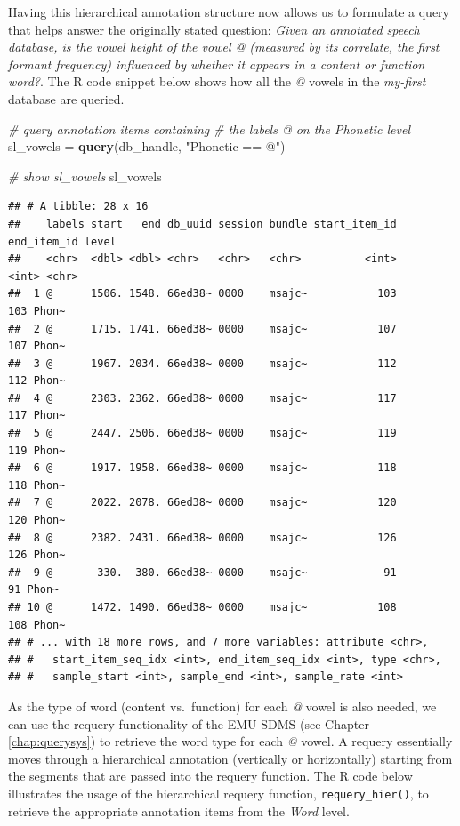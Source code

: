 \documentclass[]{book}
\newenvironment{Shaded}{\begin{snugshade}}{\end{snugshade}}
\newcommand{\CommentTok}[1]{\textcolor[rgb]{0.56,0.35,0.01}{\textit{#1}}}
\newcommand{\KeywordTok}[1]{\textcolor[rgb]{0.13,0.29,0.53}{\textbf{#1}}}
\newcommand{\NormalTok}[1]{#1}
\newcommand{\StringTok}[1]{\textcolor[rgb]{0.31,0.60,0.02}{#1}}
\begin{document}
Having this hierarchical annotation structure now allows us to formulate a query that helps answer the originally stated question: \emph{Given an annotated speech database, is the vowel height of the vowel @ (measured by its correlate, the first formant frequency) influenced by whether it appears in a content or function word?}. The R code snippet below shows how all the \emph{@} vowels in the \emph{my-first} database are queried.

\begin{Shaded}
\begin{Highlighting}[]
\CommentTok{# query annotation items containing}
\CommentTok{# the labels @ on the Phonetic level}
\NormalTok{sl_vowels =}\StringTok{ }\KeywordTok{query}\NormalTok{(db_handle, }\StringTok{"Phonetic == @"}\NormalTok{)}

\CommentTok{# show sl_vowels}
\NormalTok{sl_vowels}
\end{Highlighting}
\end{Shaded}

\begin{verbatim}
## # A tibble: 28 x 16
##    labels start   end db_uuid session bundle start_item_id end_item_id level
##    <chr>  <dbl> <dbl> <chr>   <chr>   <chr>          <int>       <int> <chr>
##  1 @      1506. 1548. 66ed38~ 0000    msajc~           103         103 Phon~
##  2 @      1715. 1741. 66ed38~ 0000    msajc~           107         107 Phon~
##  3 @      1967. 2034. 66ed38~ 0000    msajc~           112         112 Phon~
##  4 @      2303. 2362. 66ed38~ 0000    msajc~           117         117 Phon~
##  5 @      2447. 2506. 66ed38~ 0000    msajc~           119         119 Phon~
##  6 @      1917. 1958. 66ed38~ 0000    msajc~           118         118 Phon~
##  7 @      2022. 2078. 66ed38~ 0000    msajc~           120         120 Phon~
##  8 @      2382. 2431. 66ed38~ 0000    msajc~           126         126 Phon~
##  9 @       330.  380. 66ed38~ 0000    msajc~            91          91 Phon~
## 10 @      1472. 1490. 66ed38~ 0000    msajc~           108         108 Phon~
## # ... with 18 more rows, and 7 more variables: attribute <chr>,
## #   start_item_seq_idx <int>, end_item_seq_idx <int>, type <chr>,
## #   sample_start <int>, sample_end <int>, sample_rate <int>
\end{verbatim}

As the type of word (content vs.~function) for each \emph{@} vowel is also needed, we can use the requery functionality of the EMU-SDMS (see Chapter \ref{chap:querysys}) to retrieve the word type for each \emph{@} vowel. A requery essentially moves through a hierarchical annotation (vertically or horizontally) starting from the segments that are passed into the requery function. The R code below illustrates the usage of the hierarchical requery function, \texttt{requery\_hier()}, to retrieve the appropriate annotation items from the \emph{Word} level.
\end{document}
